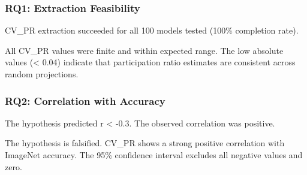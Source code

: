 
\subsubsection{RQ1: Extraction Feasibility}

CV\_PR extraction succeeded for all 100 models tested (100\% completion rate).

\begin{table}[htbp]
\centering
{}
\end{table}

All CV\_PR values were finite and within expected range. The low absolute values (< 0.04) indicate that participation ratio estimates are consistent across random projections.

\subsubsection{RQ2: Correlation with Accuracy}

The hypothesis predicted r < -0.3. The observed correlation was positive.

\begin{table}[htbp]
\centering
{}
\end{table}

The hypothesis is falsified. CV\_PR shows a strong positive correlation with ImageNet accuracy. The 95\% confidence interval excludes all negative values and zero.

